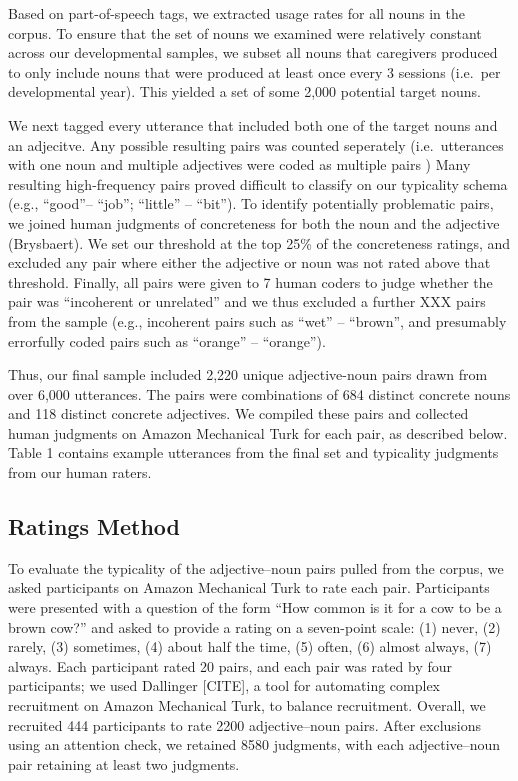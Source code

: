 \documentclass[10pt, letterpaper]{article}
\begin{document}
Based on part-of-speech tags, we extracted usage rates for all nouns in
the corpus. To ensure that the set of nouns we examined were relatively
constant across our developmental samples, we subset all nouns that
caregivers produced to only include nouns that were produced at least
once every 3 sessions (i.e.~per developmental year). This yielded a set
of some 2,000 potential target nouns.

We next tagged every utterance that included both one of the target
nouns and an adjecitve. Any possible resulting pairs was counted
seperately (i.e.~utterances with one noun and multiple adjectives were
coded as multiple pairs ) Many resulting high-frequency pairs proved
difficult to classify on our typicality schema (e.g., ``good''--
``job''; ``little'' -- ``bit''). To identify potentially problematic
pairs, we joined human judgments of concreteness for both the noun and
the adjective (Brysbaert). We set our threshold at the top 25\% of the
concreteness ratings, and excluded any pair where either the adjective
or noun was not rated above that threshold. Finally, all pairs were
given to 7 human coders to judge whether the pair was ``incoherent or
unrelated'' and we thus excluded a further XXX pairs from the sample
(e.g., incoherent pairs such as ``wet'' -- ``brown'', and presumably
errorfully coded pairs such as ``orange'' -- ``orange'').

Thus, our final sample included 2,220 unique adjective-noun pairs drawn
from over 6,000 utterances. The pairs were combinations of 684 distinct
concrete nouns and 118 distinct concrete adjectives. We compiled these
pairs and collected human judgments on Amazon Mechanical Turk for each
pair, as described below. Table 1 contains example utterances from the
final set and typicality judgments from our human raters.

\hypertarget{ratings-method}{%
\subsection{Ratings Method}\label{ratings-method}}

To evaluate the typicality of the adjective--noun pairs pulled from the
corpus, we asked participants on Amazon Mechanical Turk to rate each
pair. Participants were presented with a question of the form ``How
common is it for a cow to be a brown cow?'' and asked to provide a
rating on a seven-point scale: (1) never, (2) rarely, (3) sometimes, (4)
about half the time, (5) often, (6) almost always, (7) always. Each
participant rated 20 pairs, and each pair was rated by four
participants; we used Dallinger {[}CITE{]}, a tool for automating
complex recruitment on Amazon Mechanical Turk, to balance recruitment.
Overall, we recruited 444 participants to rate 2200 adjective--noun
pairs. After exclusions using an attention check, we retained 8580
judgments, with each adjective--noun pair retaining at least two
judgments.
\end{document}
